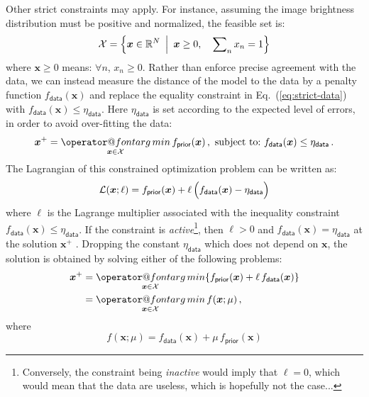 \documentclass{article}
\makeatletter
\newcommand{\MathFuncWithLimits}[1]{\mathop{\operator@font #1}\limits}
\newcommand{\Tag}[1]{\mathsf{#1}}        %
\newcommand{\V}[1]{\boldsymbol{#1}}      %
\newcommand{\argmin}{\MathFuncWithLimits{arg\,min}}
\newcommand{\Reals}{\mathbb{R}}
\newcommand{\Eq}[1]{Eq.~(\ref{#1})}
\newcommand{\Param}{x}
\newcommand{\VParam}{\V{\Param}}
\newcommand{\FeasibleSet}{\mathcal{X}}
\newcommand{\DataTag}{\Tag{data}}
\newcommand{\PriorTag}{\Tag{prior}}
\newcommand{\DataLevel}{\eta_\DataTag}
\newcommand{\Fcost}{f}
\newcommand{\Fdata}{\Fcost_\DataTag}
\newcommand{\Fprior}{\Fcost_\PriorTag}
\makeatother
\begin{document}
Other strict constraints may apply.  For instance, assuming the image
brightness distribution must be positive and normalized, the feasible set is:
\begin{equation}
  \label{eq:feasible-set}
  \FeasibleSet =
  \Bigl\{\VParam\in\Reals^N \:\Bigm\vert\: \V{\Param} \ge 0, \quad
   \sum\nolimits_n \Param_n = 1\Bigl\}
\end{equation}
where $\V{\Param} \ge 0$ means: $\forall n$, $\Param_n \ge 0$.  Rather than
enforce precise agreement with the data, we can instead measure the distance
of the model to the data by a penalty function $\Fdata(\VParam)$ and replace
the equality constraint in \Eq{eq:strict-data} with $\Fdata(\V{x}) \le
\DataLevel$. Here $\DataLevel$ is set according to the expected level of
errors, in order to avoid over-fitting the data:
\begin{equation}
  \label{eq:min-prior-st-data-const}
  \VParam^{+} = \argmin_{\VParam\in\FeasibleSet} \Fprior(\VParam)
  \,,\ \text{subject to:\ }
  \Fdata(\VParam) \le \DataLevel \, .
\end{equation}
The Lagrangian of this constrained optimization problem can be written as:
\begin{equation}
  \mathcal{L}(\VParam; \ell) = \Fprior(\VParam)
  + \ell\,\Bigl(\Fdata(\VParam) - \DataLevel\Bigr)
\end{equation}
where $\ell$ is the Lagrange multiplier associated with the inequality
constraint $\Fdata(\VParam)\le\DataLevel$.  If the constraint is
\emph{active}\footnote{Conversely, the constraint being \emph{inactive} would
imply that $\ell=0$, which would mean that the data are useless, which is
hopefully not the case...}, then $\ell>0$ and $\Fdata(\VParam)=\DataLevel$ at
the solution $\VParam^{+}$ \citep{Nocedal_Wright-2006-numerical_optimization}.
 Dropping the constant $\DataLevel$ which does not depend on $\VParam$, the
solution is obtained by solving either of the following problems:
\begin{align}
  \VParam^{+}
  &= \argmin_{\VParam\in\FeasibleSet}
     \{\Fprior(\VParam) + \ell\,\Fdata(\VParam)\} \notag \\
  &= \argmin_{\VParam\in\FeasibleSet}
     \Fcost(\VParam; \mu) \, , \notag
\end{align}
where 
\begin{equation}
  \label{eq:cost-function}
  \Fcost(\VParam; \mu) = \Fdata(\VParam) + \mu \, \Fprior(\VParam)
\end{equation}
\end{document}
